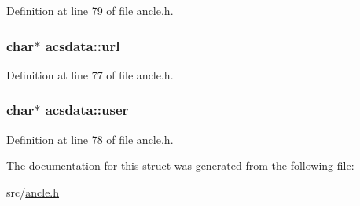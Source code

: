 Definition at line 79 of file ancle.\-h.

\hypertarget{structacsdata_a705fb13dc9a0271463e07f15ac785433}{
\subsubsection[{url}]{\setlength{\rightskip}{0pt plus 5cm}char$\ast$ acsdata\-::url}}\label{structacsdata_a705fb13dc9a0271463e07f15ac785433}


Definition at line 77 of file ancle.\-h.

\hypertarget{structacsdata_a5a023eb9d5cff7be3357abb6ebdd3172}{
\subsubsection[{user}]{\setlength{\rightskip}{0pt plus 5cm}char$\ast$ acsdata\-::user}}\label{structacsdata_a5a023eb9d5cff7be3357abb6ebdd3172}


Definition at line 78 of file ancle.\-h.



The documentation for this struct was generated from the following file\-:\begin{DoxyCompactItemize}
\item 
src/\hyperlink{ancle_8h}{ancle.\-h}\end{DoxyCompactItemize}

